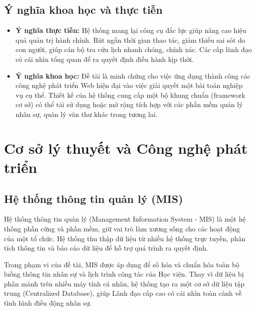 \documentclass[18pt,a4paper]{report}
\begin{document}
\section{Ý nghĩa khoa học và thực tiễn}
\begin{itemize}[leftmargin=1.2cm]
    \item \textbf{Ý nghĩa thực tiễn:} Hệ thống mang lại công cụ đắc lực giúp nâng cao hiệu quả quản trị hành chính. Rút ngắn thời gian thao tác, giảm thiểu sai sót do con người, giúp cán bộ tra cứu lịch nhanh chóng, chính xác. Các cấp lãnh đạo có cái nhìn tổng quan để ra quyết định điều hành kịp thời.
    \item \textbf{Ý nghĩa khoa học:} Đề tài là minh chứng cho việc ứng dụng thành công các công nghệ phát triển Web hiện đại vào việc giải quyết một bài toán nghiệp vụ cụ thể. Thiết kế của hệ thống cung cấp một bộ khung chuẩn (framework cơ sở) có thể tái sử dụng hoặc mở rộng tích hợp với các phần mềm quản lý nhân sự, quản lý văn thư khác trong tương lai.
\end{itemize}

\chapter{Cơ sở lý thuyết và Công nghệ phát triển}
\section{Hệ thống thông tin quản lý (MIS)}
Hệ thống thông tin quản lý (Management Information System - MIS) là một hệ thống phần cứng và phần mềm, giữ vai trò làm xương sống cho các hoạt động của một tổ chức. Hệ thống thu thập dữ liệu từ nhiều hệ thống trực tuyến, phân tích thông tin và báo cáo dữ liệu để hỗ trợ quá trình ra quyết định. 

Trong phạm vi của đề tài, MIS được áp dụng để số hóa và chuẩn hóa toàn bộ luồng thông tin nhân sự và lịch trình công tác của Học viện. Thay vì dữ liệu bị phân mảnh trên nhiều máy tính cá nhân, hệ thống tạo ra một cơ sở dữ liệu tập trung (Centralized Database), giúp Lãnh đạo cấp cao có cái nhìn toàn cảnh về tình hình điều động nhân sự.
\end{document}
